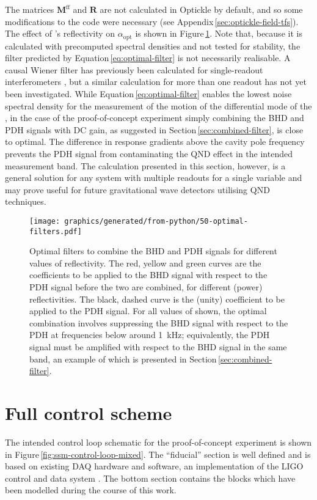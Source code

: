 The matrices $\mathbf{M}^{\textrm{ff}}$ and $\mathbf{R}$ are not calculated in Optickle by default, and so some modifications to the code were necessary (see Appendix\,\ref{sec:optickle-field-tfs}). The effect of \MINT{}'s reflectivity on $\alpha_{\textrm{opt}}$ is shown in Figure\,\ref{fig:optimal-filters}. Note that, because it is calculated with precomputed spectral densities and not tested for stability, the filter predicted by Equation\,\ref{eq:optimal-filter} is not necessarily realisable. A causal Wiener filter has previously been calculated for single-readout interferometers \cite{MuellerEbhardt2009, Miao2010}, but a similar calculation for more than one readout has not yet been investigated. While Equation\,\ref{eq:optimal-filter} enables the lowest noise spectral density for the measurement of the motion of the differential mode of the \SSM{}, in the case of the proof-of-concept experiment simply combining the \gls{BHD} and \gls{PDH} signals with \gls{DC} gain, as suggested in Section\,\ref{sec:combined-filter}, is close to optimal. The difference in response gradients above the cavity pole frequency prevents the \gls{PDH} signal from contaminating the \gls{QND} effect in the intended measurement band. The calculation presented in this section, however, is a general solution for any system with multiple readouts for a single variable and may prove useful for future gravitational wave detectors utilising \gls{QND} techniques.
\begin{figure}
  \texttt{[image: graphics/generated/from-python/50-optimal-filters.pdf]}
  \caption[Optimal filters to combine the balanced homodyne and Pound-Drever-Hall signals for different values of \MINT{} reflectivity]{\label{fig:optimal-filters}Optimal filters to combine the BHD and PDH signals for different values of \MINT{} reflectivity. The red, yellow and green curves are the coefficients to be applied to the BHD signal with respect to the PDH signal before the two are combined, for different \MINT{} (power) reflectivities. The black, dashed curve is the (unity) coefficient to be applied to the PDH signal. For all values of \MINT{} shown, the optimal combination involves suppressing the BHD signal with respect to the PDH at frequencies below around \SI{1}{\kilo\hertz}; equivalently, the PDH signal must be amplified with respect to the BHD signal in the same band, an example of which is presented in Section\,\ref{sec:combined-filter}.}
\end{figure}

\section{\label{ssm-control-scheme}Full control scheme}
The intended control loop schematic for the proof-of-concept experiment is shown in Figure\,\ref{fig:ssm-control-loop-mixed}. The ``fiducial'' section is well defined and is based on existing DAQ hardware and software, an implementation of the LIGO control and data system \cite{Bork2010}. The bottom section contains the blocks which have been modelled during the course of this work.

